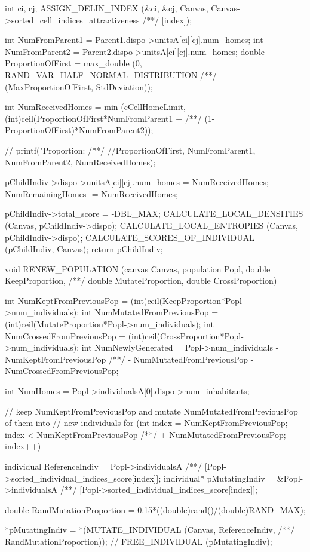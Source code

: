 \begin{C}
{{		int ci, cj;
		ASSIGN_DELIN_INDEX (&ci, &cj, Canvas, Canvas->sorted_cell_indices_attractiveness
		/**/ [index]);
		
		int NumFromParent1 = Parent1.dispo->unitsA[ci][cj].num_homes;
		int NumFromParent2 = Parent2.dispo->unitsA[ci][cj].num_homes;
		double ProportionOfFirst = max_double (0, RAND_VAR_HALF_NORMAL_DISTRIBUTION
		/**/ (MaxProportionOfFirst, StdDeviation));
		
		int NumReceivedHomes = min (cCellHomeLimit, (int)ceil(ProportionOfFirst*NumFromParent1 +
		/**/ (1-ProportionOfFirst)*NumFromParent2));
		
		// printf("Proportion: %
		/**/ //ProportionOfFirst, NumFromParent1, NumFromParent2, NumReceivedHomes);
		
		pChildIndiv->dispo->unitsA[ci][cj].num_homes = NumReceivedHomes;
		NumRemainingHomes -= NumReceivedHomes;
	}
	pChildIndiv->total_score = -DBL_MAX;
	CALCULATE_LOCAL_DENSITIES (Canvas, pChildIndiv->dispo);
	CALCULATE_LOCAL_ENTROPIES (Canvas, pChildIndiv->dispo);
	CALCULATE_SCORES_OF_INDIVIDUAL (pChildIndiv, Canvas);
	return pChildIndiv;
}

void RENEW_POPULATION (canvas Canvas, population Popl, double KeepProportion,
/**/ double MutateProportion, double CrossProportion){
	
	int NumKeptFromPreviousPop = (int)ceil(KeepProportion*Popl->num_individuals);
	int NumMutatedFromPreviousPop = (int)ceil(MutateProportion*Popl->num_individuals);
	int NumCrossedFromPreviousPop = (int)ceil(CrossProportion*Popl->num_individuals);
	int NumNewlyGenerated = Popl->num_individuals - NumKeptFromPreviousPop
	/**/ - NumMutatedFromPreviousPop - NumCrossedFromPreviousPop;
	
	int NumHomes = Popl->individualsA[0].dispo->num_inhabitants;
	
	// keep NumKeptFromPreviousPop and mutate NumMutatedFromPreviousPop of them into
	// new individuals
	for (int index = NumKeptFromPreviousPop; index < NumKeptFromPreviousPop
	/**/ + NumMutatedFromPreviousPop; index++){
		
		individual ReferenceIndiv = Popl->individualsA
		/**/ [Popl->sorted_individual_indices_score[index]];
		individual* pMutatingIndiv = &Popl->individualsA
		/**/ [Popl->sorted_individual_indices_score[index]];
		
		double RandMutationProportion = 0.15*((double)rand()/(double)RAND_MAX);
		
		*pMutatingIndiv = *(MUTATE_INDIVIDUAL (Canvas, ReferenceIndiv,
		/**/ RandMutationProportion));
		// FREE_INDIVIDUAL (pMutatingIndiv);
	}
	
}
\end{C}
